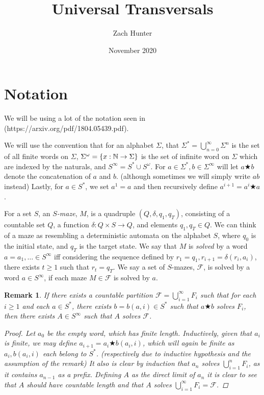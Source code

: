 \documentclass[a4paper]{article}
\title{Universal Transversals}
\author{Zach Hunter}
\date{November 2020}
\newtheorem{rmk}[result]{Remark}
\theoremstyle{definition}
\begin{document}
\maketitle

\section{Notation}

We will be using a lot of the notation seen in (https://arxiv.org/pdf/1804.05439.pdf). 

We will use the convention that for an alphabet $\Sigma$, that $\Sigma^* = \bigcup_{n=0}^\infty \Sigma^n$ is the set of all finite words on $\Sigma$, $\Sigma^\omega = \{x:\Bbb{N}\to\Sigma\}$ is the set of infinite word on $\Sigma$ which are indexed by the naturals, and $S^\infty = S^*\cup S^\omega$. For $a \in \Sigma^*, b \in \Sigma^\infty$ will let $a\bigstar b$ denote the concatenation of $a$ and $b$. (although sometimes we will simply write $ab$ instead) Lastly, for $a \in S^*$, we set $a^1 = a$ and then recursively define $a^{i+1} = a^i\bigstar a$.

For a set $S$, an $S$\textit{-maze}, $M$, is a quadruple $(Q,\delta,q_1,q_T)$, consisting of a countable set $Q$, a function $\delta:Q\times S \to Q$, and elements $q_1,q_T \in Q$. We can think of a maze as resembling a deterministic automata on the alphabet $S$, where $q_0$ is the initial state, and $q_T$ is the target state. We say that $M$ is \textit{solved} by a word $a = a_1,\dots \in S^\infty$ iff considering the sequence defined by $r_1 = q_1, r_{i+1} = \delta(r_i,a_i)$, there exists $t\ge 1$ such that $r_t = q_T$. We say a set of $S$-mazes, $\mathcal{F}$, is solved by a word $a \in S^\infty$, if each maze $M\in \mathcal{F}$ is solved by $a$.

\begin{rmk}\label{fstrat} If there exists a countable partition $\mathcal{F} = \bigcup_{i=1}^\infty F_i$ such that for each $i\ge 1$ and each $a \in S^*$, there exists $b=b(a,i) \in S^*$ such that $a \bigstar b$ solves $F_i$, then there exists $A \in S^\infty$ such that $A$ solves $\mathcal{F}$.
\begin{proof}
    Let $a_0$ be the empty word, which has finite length. Inductively, given that $a_i$ is finite, we may define $a_{i+1} = a_i \bigstar b(a_i,i)$, which will again be finite as $a_i,b(a_i,i)$ each belong to $S^*$. (respectively due to inductive hypothesis and the assumption of the remark) It also is clear by induction that $a_n$ solves $\bigcup_{i=1}^n F_i$, as it contains $a_{n-1}$ as a prefix. Defining $A$ as the direct limit of $a_n$ it is clear to see that $A$ should have countable length and that $A$ solves $\bigcup_{i=1}^\infty F_i = \mathcal{F}$.
\end{proof}
\end{rmk}
\end{document}
